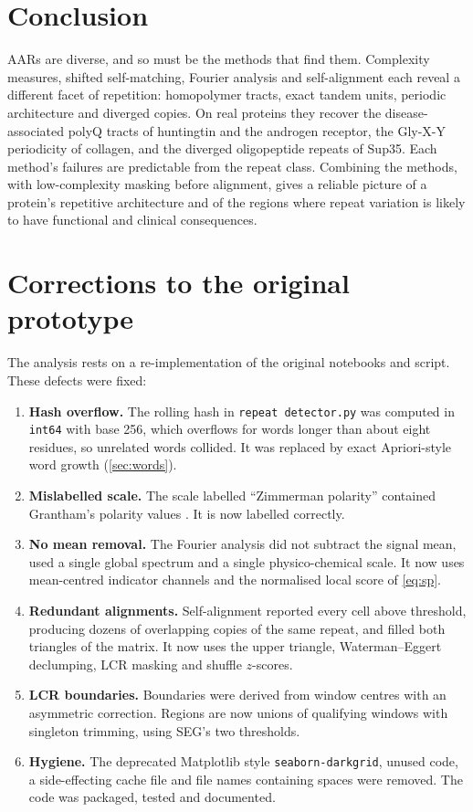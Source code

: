 \documentclass[11pt,a4paper]{article}
\newcommand{\code}[1]{\texttt{#1}}
\begin{document}
\section{Conclusion}
AARs are diverse, and so must be the methods that find them. Complexity measures, shifted self-matching,
Fourier analysis and self-alignment each reveal a different facet of repetition: homopolymer tracts, exact
tandem units, periodic architecture and diverged copies. On real proteins they recover the disease-associated
polyQ tracts of huntingtin and the androgen receptor, the Gly-X-Y periodicity of collagen, and the diverged
oligopeptide repeats of Sup35. Each method's failures are predictable from the repeat class. Combining the
methods, with low-complexity masking before alignment, gives a reliable picture of a protein's repetitive
architecture and of the regions where repeat variation is likely to have functional and clinical consequences.

\appendix
\section{Corrections to the original prototype}\label{app:changes}
The analysis rests on a re-implementation of the original notebooks and script. These defects were fixed:
\begin{enumerate}
  \item \textbf{Hash overflow.} The rolling hash in \code{repeat detector.py} was computed in \code{int64} with base 256,
        which overflows for words longer than about eight residues, so unrelated words collided. It was replaced
        by exact Apriori-style word growth (\cref{sec:words}).
  \item \textbf{Mislabelled scale.} The scale labelled ``Zimmerman polarity'' contained Grantham's polarity values
        \cite{grantham1974difference}. It is now labelled correctly.
  \item \textbf{No mean removal.} The Fourier analysis did not subtract the signal mean, used a single global
        spectrum and a single physico-chemical scale. It now uses mean-centred indicator channels and the normalised
        local score of \cref{eq:sp}.
  \item \textbf{Redundant alignments.} Self-alignment reported every cell above threshold, producing dozens of
        overlapping copies of the same repeat, and filled both triangles of the matrix. It now uses the upper triangle,
        Waterman--Eggert declumping, LCR masking and shuffle $z$-scores.
  \item \textbf{LCR boundaries.} Boundaries were derived from window centres with an asymmetric correction. Regions are now
        unions of qualifying windows with singleton trimming, using SEG's two thresholds.
  \item \textbf{Hygiene.} The deprecated Matplotlib style \code{seaborn-darkgrid}, unused code, a side-effecting
        cache file and file names containing spaces were removed. The code was packaged, tested and documented.
\end{enumerate}

\printbibliography[heading=bibintoc]
\end{document}
